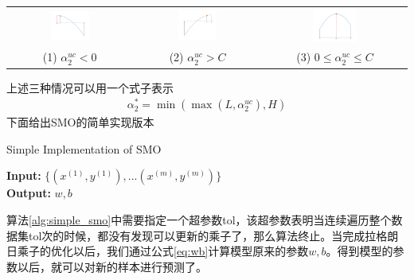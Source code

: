\documentclass[11pt]{article}
\begin{document}
\setlength\tabcolsep{1.5pt}
\begin{tabular}{ccc}
	\includegraphics[width=0.33\textwidth]{images/img13.png} & \includegraphics[width=0.33\textwidth]{images/img12.png} &
	\includegraphics[width=0.33\textwidth]{images/img11.png}\\
	(1) $\alpha_2^{uc} < 0$ & (2) $\alpha_2^{uc} > C$ &
	(3) $0 \leq \alpha_2^{uc} \leq C$ 
\end{tabular}
上述三种情况可以用一个式子表示
\begin{align}
\alpha_2^* = \min(\max(L, \alpha^{uc}_2), H)
\end{align}
下面给出SMO的简单实现版本
\begin{algorithm}[H] 
	\caption{Simple Implementation of SMO}
	\label{alg:simple_smo}
	\textbf{Input:} $\{(x^{(1)}, y^{(1)}),...(x^{(m)}, y^{(m)})\}$\\
	\textbf{Output:} $w, b$
	\begin{algorithmic}[1]
		\Statex
		\EndIf
		\EndIf
		\EndFor
		\EndWhile
	\end{algorithmic}
\end{algorithm}
算法\ref{alg:simple_smo}中需要指定一个超参数tol，该超参数表明当连续遍历整个数据集tol次的时候，都没有发现可以更新的乘子了，那么算法终止。当完成拉格朗日乘子的优化以后，我们通过公式\ref{eq:wb}计算模型原来的参数$w,b$。得到模型的参数以后，就可以对新的样本进行预测了。
\end{document}
